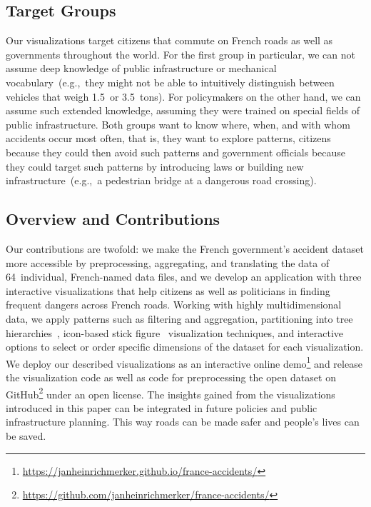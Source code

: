 \subsection{Target Groups}
Our visualizations target citizens that commute on French roads as well as governments throughout the world. For the first group in particular, we can not assume deep knowledge of public infrastructure or mechanical vocabulary~(e.g.,~they might not be able to intuitively distinguish between vehicles that weigh 1.5~or 3.5~tons). For policymakers on the other hand, we can assume such extended knowledge, assuming they were trained on special fields of public infrastructure. Both groups want to know where, when, and with whom accidents occur most often, that is, they want to explore patterns, citizens because they could then avoid such patterns and government officials because they could target such patterns by introducing laws or building new infrastructure~(e.g.,~a pedestrian bridge at a dangerous road crossing).

\subsection{Overview and Contributions}
Our contributions are twofold: \Ni we make the French government's accident dataset more accessible by preprocessing, aggregating, and translating the data of 64~individual, French-named data files, and \Nii we develop an application with three interactive visualizations that help citizens as well as politicians in finding frequent dangers across French roads.
Working with highly multidimensional data, we apply patterns such as filtering and aggregation, partitioning into tree hierarchies~\cite{Shneiderman1992}, icon-based stick figure~\cite{PickettG1988} visualization techniques, and interactive options to select or order specific dimensions of the dataset for each visualization.
We deploy our described visualizations as an interactive online demo\footnote{\url{https://janheinrichmerker.github.io/france-accidents/}} and release the visualization code as well as code for preprocessing the open dataset on GitHub\footnote{\url{https://github.com/janheinrichmerker/france-accidents/}} under an open license.
The insights gained from the visualizations introduced in this paper can be integrated in future policies and public infrastructure planning. This way roads can be made safer and people's lives can be saved.

